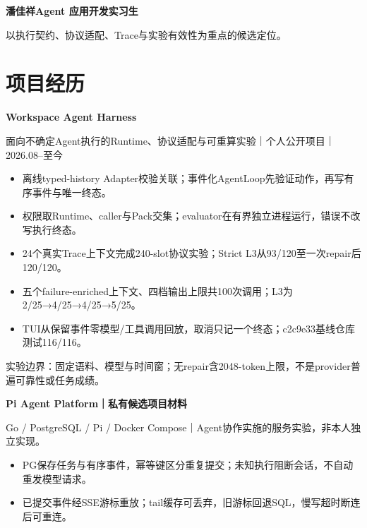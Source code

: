 \documentclass[10pt,a4paper,UTF8,fontset=fandol]{ctexart}
\begin{document}
\fontsize{9.5}{12.0}\selectfont
{\fontsize{23.5}{26}\selectfont\bfseries 潘佳祥}\hfill {\color{navy}\bfseries Agent 应用开发实习生}
\par{}
\par{}
\par\vspace{0.3em}以执行契约、协议适配、Trace与实验有效性为重点的候选定位。
\section{项目经历}
{\bfseries\color{navy}Workspace Agent Harness}\par
{\color{muted}\fontsize{8.8}{10.8}\selectfont 面向不确定Agent执行的Runtime、协议适配与可重算实验｜个人公开项目｜2026.08--至今}\par
\begin{itemize}
\item 离线typed-history Adapter校验关联；事件化AgentLoop先验证动作，再写有序事件与唯一终态。
\item 权限取Runtime、caller与Pack交集；evaluator在有界独立进程运行，错误不改写执行终态。
\item 24个真实Trace上下文完成240-slot协议实验；Strict L3从93/120至一次repair后120/120。
\item 五个failure-enriched上下文、四档输出上限共100次调用；L3为2/25→4/25→4/25→5/25。
\item TUI从保留事件零模型/工具调用回放，取消只记一个终态；c2c9e33基线仓库测试116/116。
\end{itemize}
{\color{muted}\fontsize{8.5}{10.4}\selectfont 实验边界：固定语料、模型与时间窗；无repair含2048-token上限，不是provider普遍可靠性或任务成绩。\par}
\vspace{0.6em}
{\bfseries\color{navy}Pi Agent Platform｜私有候选项目材料}\par
{\color{muted}\fontsize{8.8}{10.8}\selectfont Go / PostgreSQL / Pi / Docker Compose｜Agent协作实施的服务实验，非本人独立实现。}\par
\begin{itemize}
\item PG保存任务与有序事件，幂等键区分重复提交；未知执行阻断会话，不自动重发模型请求。
\item 已提交事件经SSE游标重放；tail缓存可丢弃，旧游标回退SQL，慢写超时断连后可重连。
\end{itemize}
\end{document}
